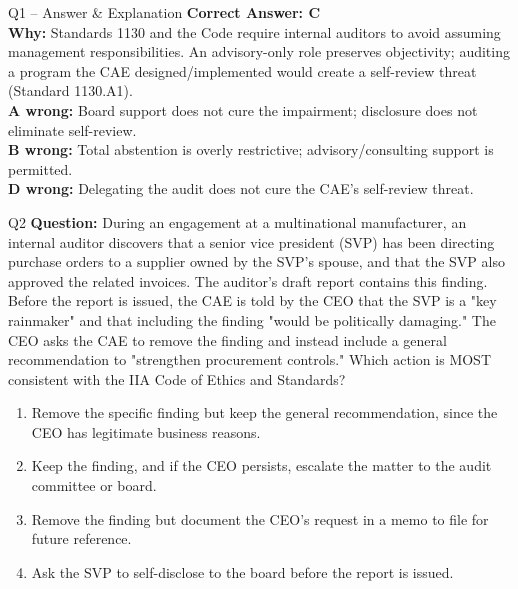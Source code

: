 \documentclass[aspectratio=169,10pt]{beamer}
\begin{document}
	\begin{frame}[t]{Q1 -- Answer \& Explanation}
		\small
		\textbf{Correct Answer: C} \\[4pt]
		\textbf{Why:} Standards 1130 and the Code require internal auditors to avoid assuming management responsibilities. An advisory-only role preserves objectivity; auditing a program the CAE designed/implemented would create a self-review threat (Standard 1130.A1). \\[4pt]
		\textbf{A wrong:} Board support does not cure the impairment; disclosure does not eliminate self-review. \\[2pt]
		\textbf{B wrong:} Total abstention is overly restrictive; advisory/consulting support is permitted. \\[2pt]
		\textbf{D wrong:} Delegating the audit does not cure the CAE's self-review threat.
	\end{frame}
	
	\begin{frame}[t]{Q2}
		\small
		\textbf{Question:} During an engagement at a multinational manufacturer, an internal auditor discovers that a senior vice president (SVP) has been directing purchase orders to a supplier owned by the SVP's spouse, and that the SVP also approved the related invoices. The auditor's draft report contains this finding. Before the report is issued, the CAE is told by the CEO that the SVP is a "key rainmaker" and that including the finding "would be politically damaging." The CEO asks the CAE to remove the finding and instead include a general recommendation to "strengthen procurement controls." Which action is MOST consistent with the IIA Code of Ethics and Standards?
		\begin{enumerate}[label=\Alph*.,itemsep=1pt,topsep=2pt]
			\item Remove the specific finding but keep the general recommendation, since the CEO has legitimate business reasons.
			\item Keep the finding, and if the CEO persists, escalate the matter to the audit committee or board.
			\item Remove the finding but document the CEO's request in a memo to file for future reference.
			\item Ask the SVP to self-disclose to the board before the report is issued.
		\end{enumerate}
	\end{frame}
	
\end{document}
